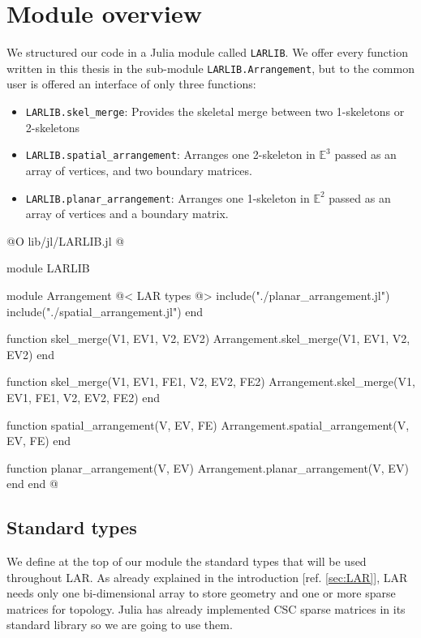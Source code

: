 \chapter{Module overview}

We structured our code in a Julia module called \texttt{LARLIB}.
We offer every function written in this thesis in the sub-module
\texttt{LARLIB.Arrangement}, but to the common user is offered
an interface of only three functions:
\begin{itemize}[noitemsep]
    \item \texttt{LARLIB.skel\_merge}: Provides the skeletal merge between two
        1-skeletons or 2-skeletons
    \item \texttt{LARLIB.spatial\_arrangement}: Arranges one 2-skeleton 
        in $\mathbb{E}^3$ passed as an array of vertices, and two boundary matrices.
    \item \texttt{LARLIB.planar\_arrangement}: Arranges one 1-skeleton 
        in $\mathbb{E}^2$ passed as an array of vertices and a boundary matrix.
\end{itemize}


@O lib/jl/LARLIB.jl
@{module LARLIB

    module Arrangement
        @< LAR types @>
        include("./planar_arrangement.jl")
        include("./spatial_arrangement.jl")
    end

    function skel_merge(V1, EV1, V2, EV2)
        Arrangement.skel_merge(V1, EV1, V2, EV2)
    end

    function skel_merge(V1, EV1, FE1, V2, EV2, FE2)
        Arrangement.skel_merge(V1, EV1, FE1, V2, EV2, FE2)
    end

    function spatial_arrangement(V, EV, FE)
        Arrangement.spatial_arrangement(V, EV, FE)
    end

    function planar_arrangement(V, EV)
        Arrangement.planar_arrangement(V, EV)
    end
end
@}

\section{Standard types}

We define at the top of our module the standard types
that will be used throughout LAR. As already explained
in the introduction [ref. \ref{sec:LAR}], LAR needs
only one bi-dimensional array to store geometry and 
one or more sparse matrices for topology.
Julia has already implemented CSC sparse matrices in
its standard library so we are going to use them.

